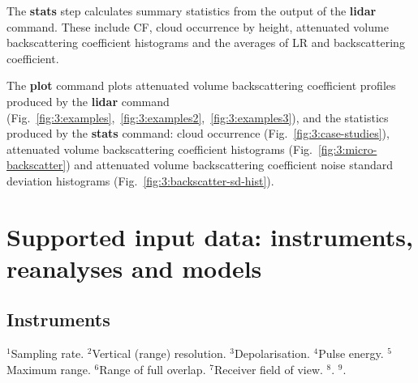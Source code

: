 The \textbf{stats} step calculates summary statistics from the output of the
\textbf{lidar} command. These include CF, cloud occurrence by height,
attenuated volume backscattering coefficient histograms and the averages of LR and backscattering coefficient.

The \textbf{plot} command plots attenuated volume backscattering coefficient profiles produced by the \textbf{lidar}
command (Fig.~\ref{fig:3:examples},~\ref{fig:3:examples2},~\ref{fig:3:examples3}), and
the statistics produced by the \textbf{stats} command: cloud occurrence
(Fig.~\ref{fig:3:case-studies}), attenuated volume backscattering coefficient histograms (Fig.~\ref{fig:3:micro-backscatter})
and attenuated volume backscattering coefficient noise standard deviation histograms (Fig.~\ref{fig:3:backscatter-sd-hist}).

\section{Supported input data: instruments, reanalyses and models}
\label{sec:3:supported-alcs-reanalyses-and-models}

\subsection{Instruments}
\label{sec:3:alcs}

\begin{table}[t]
\caption[Table of ALCs and their technical parameters]{Table of ALCs and their technical parameters. Power is calculated as Pulse $\times$ Pulse Repetition Frequency (PRF).}
\label{tab:3:alcs}
\centerline{}
\vspace{6pt}
\footnotesize
$^1$Sampling rate.
$^2$Vertical (range) resolution.
$^3$Depolarisation.
$^4$Pulse energy.
$^5$Maximum range.
$^6$Range of full overlap.
$^7$Receiver field of view.
$^8$\cite{hopkin2019}.
$^9$\cite{madonna2018}.

\end{table}

